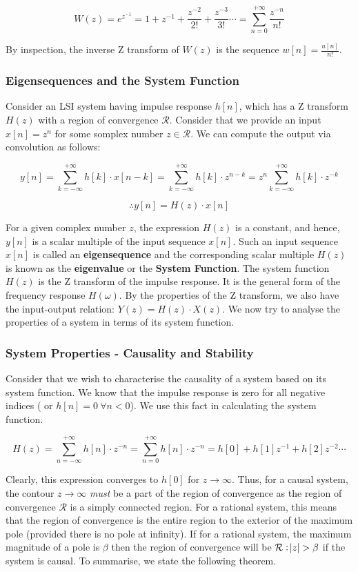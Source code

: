 \documentclass{article}
\theoremstyle{definition}
\begin{document}
\[
	W(z) = e^{z^{-1}} = 1 + z^{-1} + \frac{z^{-2}}{2!} + \frac{z^{-3}}{3!} \cdots = \sum_{n=0}^{+\infty} \frac{z^{-n}}{n!}
\]

By inspection, the inverse Z transform of $W(z)$ is the sequence $w[n] = \frac{u[n]}{n!}$.

\subsubsection{Eigensequences and the System Function}

Consider an LSI system having impulse response $h[n]$, which has a Z transform $H(z)$ with a region of convergence $\mathcal{R}$. Consider that we provide an input $x[n] = z^n$ for some somplex number $z \in \mathcal{R}$. We can compute the output via convolution as follows:

\[
	y[n] = \sum_{k=-\infty}^{+\infty} h[k] \cdot x[n-k] = \sum_{k=-\infty}^{+\infty} h[k] \cdot z^{n-k} = z^n \sum_{k=-\infty}^{+\infty}h[k] \cdot z^{-k}
\]

\[
	\therefore \boxed{y[n] = H(z) \cdot x[n]}
\]

For a given complex number $z$, the expression $H(z)$ is a constant, and hence, $y[n]$ is a scalar multiple of the input sequence $x[n]$. Such an input sequence $x[n]$ is called an \textbf{eigensequence} and the corresponding scalar multiple $H(z)$ is known as the \textbf{eigenvalue} or the \textbf{System Function}. The system function $H(z)$ is the Z transform of the impulse response. It is the general form of the frequency response $H(\omega)$. By the properties of the Z transform, we also have the input-output relation: $Y(z) = H(z) \cdot X(z)$. We now try to analyse the properties of a system in terms of its system function.

\subsubsection{System Properties - Causality and Stability}

Consider that we wish to characterise the causality of a system based on its system function. We know that the impulse response is zero for all negative indices ( or $h[n] = 0 \: \forall n < 0$). We use this fact in calculating the system function. 

\[
	H(z) = \sum_{n=-\infty}^{+\infty} h[n] \cdot z^{-n} = \sum_{n=0}^{+\infty} h[n] \cdot z^{-n} = h[0] + h[1]z^{-1} + h[2]z^{-2} \cdots 
\]

Clearly, this expression converges to $h[0]$ for $ z\rightarrow \infty$. Thus, for a causal system, the contour $z \rightarrow \infty$ \textit{must} be a part of the region of convergence as the region of convergence $\mathcal{R}$ is a simply connected region. For a rational system, this means that the region of convergence is the entire region to the exterior of the maximum pole (provided there is no pole at infinity). If for a rational system, the maximum magnitude of a pole is $\beta$ then the region of convergence will be $\mathcal{R} : \abs{z} > \beta$ if the system is causal. To summarise, we state the following theorem.
\end{document}
